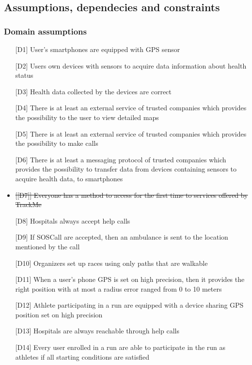 \subsection{Assumptions, dependecies and constraints}

\subsubsection{Domain assumptions}
\begin{itemize}
\item[{[D1]}] User's smartphones are equipped with GPS sensor
\item[{[D2]}] Users own devices with sensors to acquire data information about health status
\item[{[D3]}] Health data collected by the devices are correct
\item[{[D4]}] There is at least an external service of trusted companies which provides the possibility to the user to view detailed maps
\item[{[D5]}] There is at least an external service of trusted companies which provides the possibility to make calls
\item[{[D6]}] There is at least a messaging protocol of trusted companies which provides the possibility to transfer data from devices containing sensors to acquire health data, to smartphones
\item \st{[{[D7]}] Everyone has a method to access for the first time to services offered by TrackMe}
\item[{[D8]}] Hospitals always accept help calls
\item[{[D9]}] If SOSCall are accepted, then an ambulance is sent to the location mentioned by the call
\item[{[D10]}] Organizers set up races using only paths that are walkable
\item[{[D11]}] When a user's phone GPS is set on high precision, then it provides the right position with at most a radius error ranged from 0 to 10 meters
\item[{[D12]}] Athlete participating in a run are equipped with a device sharing GPS position set on high precision
\item[{[D13]}] Hospitals are always reachable through help calls
\item[{[D14]}] Every user enrolled in a run are able to participate in the run as athletes if all starting conditions are satisfied
\end{itemize}
